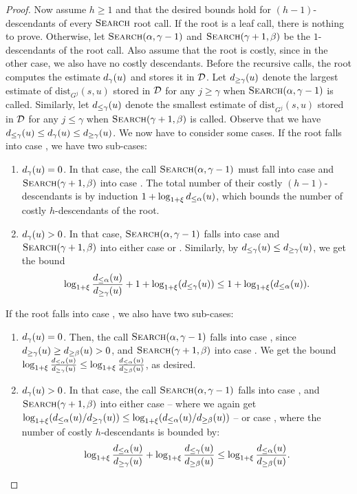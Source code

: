 \documentclass[11pt,letterpaper]{article}
\theoremstyle{plain}
\newcommand{\dist}{\mathrm{dist}}
\begin{document}
\begin{proof}
  Now assume $h\geq 1$ and that the desired bounds hold for $(h - 1)$-descendants of every $\textproc{Search}$ root call.
  If the root is a leaf call, there is nothing to prove.
	Otherwise, let $\textproc{Search}(\alpha, \gamma - 1)$ and $\textproc{Search}(\gamma + 1, \beta)$ be the $1$-descendants of the root call.
	Also assume that the root is costly, since in the other case, we also have no costly descendants.
	Before the recursive calls, the root computes the estimate $d_{\gamma}(u)$ and stores it in $\mathcal{D}$.
	Let $d_{\ge\gamma}(u)$ denote the largest estimate of $\dist_{G^j}(s,u)$ stored in $\mathcal{D}$ for any $j \ge \gamma$ when $\textproc{Search}(\alpha, \gamma - 1)$ is called.
  Similarly,
	let $d_{\le\gamma}(u)$ denote the smallest estimate of $\dist_{G^j}(s,u)$ stored in $\mathcal{D}$ for any $j \le \gamma$ when $\textproc{Search}(\gamma + 1, \beta)$ is called.
	Observe that we have $d_{\le\gamma}(u) \le d_{\gamma}(u) \le d_{\ge\gamma}(u)$.
	We now have to consider some cases.
	If the root falls into case , we have two sub-cases:
  \begin{enumerate}[label=$2.{\arabic*}^\circ)$]
		\item $d_{\gamma}(u) = 0$.
			In that case, the call $\textproc{Search}(\alpha, \gamma - 1)$ must fall into case  and \linebreak $\textproc{Search}(\gamma + 1, \beta)$ into case .
			The total number of their costly $(h - 1)$-descendants is by induction $1 + \log_{1 + \xi} d_{\le\alpha}(u)$, which bounds the number of costly $h$-descendants of the root.
		\item $d_{\gamma}(u) > 0$.
			In that case, $\textproc{Search}(\alpha, \gamma - 1)$ falls into case  and $\textproc{Search}(\gamma + 1, \beta)$ into either case  or .
      Similarly, by $d_{\le\gamma}(u)\leq d_{\ge\gamma}(u)$, we get the bound
      \[ \log_{1 + \xi}\frac{d_{\le\alpha}(u)}{d_{\ge\gamma}(u)} + 1 + \log_{1 + \xi}(d_{\le\gamma}(u)) \le 1 + \log_{1 + \xi}(d_{\le\alpha}(u)).\]
	\end{enumerate}
	If the root falls into case , we also have two sub-cases:
  \begin{enumerate}[label=$3.{\arabic*}^\circ)$]
		\item $d_{\gamma}(u) = 0$.
			Then, the call $\textproc{Search}(\alpha, \gamma - 1)$ falls into case , since $d_{\ge\gamma}(u) \ge d_{\ge\beta}(u) > 0$, and $\textproc{Search}(\gamma + 1, \beta)$ into case .
			We get the bound
      $\log_{1 + \xi} \frac{d_{\le\alpha}(u)}{d_{\ge\gamma}(u)} \le \log_{1 + \xi} \frac{d_{\le\alpha}(u)}{d_{\ge\beta}(u)}$, as desired.
		\item $d_{\gamma}(u) > 0$.
			In that case, the call $\textproc{Search}(\alpha, \gamma - 1)$ falls into case , and $\textproc{Search}(\gamma + 1, \beta)$ into either case  -- where we again get 
			$\log_{1 + \xi} (d_{\le\alpha}(u)/d_{\ge\gamma}(u)) \le \log_{1 + \xi} (d_{\le\alpha}(u)/d_{\ge\beta}(u))$ --
			or case , where the number of costly $h$-descendants is bounded by:
			\[ \log_{1 + \xi} \frac{d_{\le\alpha}(u)}{d_{\ge\gamma}(u)} + \log_{1 + \xi} \frac{d_{\le\gamma}(u)}{d_{\ge\beta}(u)} \le \log_{1 + \xi} \frac{d_{\le\alpha}(u)}{d_{\ge\beta}(u)}. \]
	\end{enumerate}
\end{proof}
\end{document}
